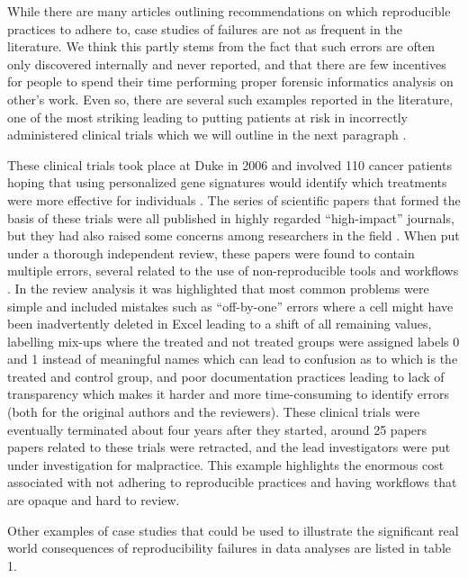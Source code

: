 \documentclass[
  12 pt,
]{paper}
\begin{document}
While there are many articles outlining recommendations
on which reproducible practices to adhere to,
case studies of failures are not as frequent in the literature.
We think this partly stems from the fact
that such errors are often only discovered internally and never reported,
and that there are few incentives for people
to spend their time performing proper forensic informatics analysis on other's work.
Even so,
there are several such examples reported in the literature,
one of the most striking leading to putting patients at risk
in incorrectly administered clinical trials
which we will outline in the next paragraph \autocite{carlson_carlson_2012}.

These clinical trials took place at Duke in 2006
and involved 110 cancer patients
hoping that using personalized gene signatures
would identify which treatments were more effective for individuals \autocite{carlson_carlson_2012}.
The series of scientific papers that formed the basis of these trials
were all published in highly regarded ``high-impact'' journals,
but they had also raised some concerns among researchers in the field \autocite{carlson_carlson_2012}.
When put under a thorough independent review,
these papers were found to contain multiple errors,
several related to the use of non-reproducible tools
and workflows \autocite{baggerly2009deriving}.
In the review analysis it was highlighted that most common problems were simple
and included mistakes such as ``off-by-one'' errors
where a cell might have been inadvertently deleted in Excel
leading to a shift of all remaining values,
labelling mix-ups where the treated and not treated groups
were assigned labels 0 and 1 instead of meaningful names
which can lead to confusion as to which is the treated and control group,
and poor documentation practices leading to lack of transparency
which makes it harder and more time-consuming to identify errors
(both for the original authors and the reviewers).
These clinical trials were eventually terminated about four years after they started,
around 25 papers papers related to these trials were retracted,
and the lead investigators were put under investigation for malpractice.
This example highlights the enormous cost
associated with not adhering to reproducible practices
and having workflows that are opaque and hard to review.

Other examples of case studies that could be used to illustrate the significant
real world consequences of reproducibility failures in data analyses
are listed in table 1.
\end{document}
